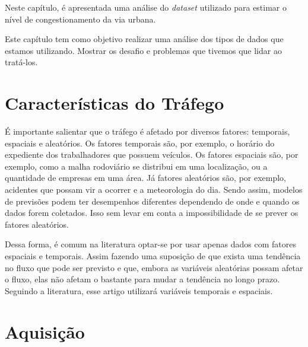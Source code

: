 





Neste capítulo, é apresentada uma análise do \textit{dataset} utilizado para estimar o nível de congestionamento da via urbana.




Este capítulo tem como objetivo realizar uma análise dos tipos de dados que estamos utilizando. Mostrar os desafio e problemas que tivemos que lidar ao tratá-los.

\section{Características do Tráfego}

É importante salientar que o tráfego é afetado por diversos fatores: temporais, espaciais e aleatórios. Os fatores temporais são, por exemplo, o horário do expediente dos trabalhadores que possuem veículos. Os fatores espaciais são, por exemplo, como a malha rodoviário se distribui em uma localização, ou a quantidade de empresas em uma área. Já fatores aleatórios são, por exemplo, acidentes que possam vir a ocorrer e a meteorologia do dia. Sendo assim, modelos de previsões podem ter desempenhos diferentes dependendo de onde e quando os dados forem coletados. Isso sem levar em conta a impossibilidade de se prever os fatores aleatórios.

Dessa forma, é comum na literatura optar-se por usar apenas dados com fatores espaciais e temporais. Assim fazendo uma suposição de que exista uma tendência no fluxo que pode ser previsto e que, embora as variáveis aleatórias possam afetar o fluxo, elas não afetam o bastante para mudar a tendência no longo prazo. Seguindo a literatura, esse artigo utilizará variáveis temporais e espaciais.


\section{Aquisição}

